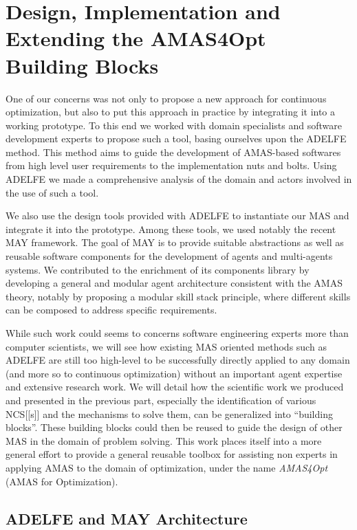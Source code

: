 \part{Design, Implementation and Extending the AMAS4Opt Building Blocks}

One of our concerns was not only to propose a new approach for continuous optimization, but also to put this approach in practice by integrating it into a working prototype. To this end we worked with domain specialists and software development experts to propose such a tool, basing ourselves upon the ADELFE method. This method aims to guide the development of AMAS-based softwares from high level user requirements to the implementation nuts and bolts. Using ADELFE we made a comprehensive analysis of the domain and actors involved in the use of such a tool.

We also use the design tools provided with ADELFE to instantiate our MAS and integrate it into the prototype. Among these tools, we used notably the recent MAY framework. The goal of MAY is to provide suitable abstractions as well as reusable software components for the development of agents and multi-agents systems. We contributed to the enrichment of its components library by developing a general and modular agent architecture consistent with the AMAS theory, notably by proposing a modular skill stack principle, where different skills can be composed to address specific requirements.

While such work could seems to concerns software engineering experts more than computer scientists, we will see how existing MAS oriented methods such as ADELFE are still too high-level to be successfully directly applied to any domain (and more so to continuous optimization) without an important agent expertise and extensive research work. We will detail how the scientific work we produced and presented in the previous part, especially the identification of various NCS[[s]] and the mechanisms to solve them, can be generalized into \enquote{building blocks}. These building blocks could then be reused to guide the design of other MAS in the domain of problem solving. This work places itself into a more general effort to provide a general reusable toolbox for assisting non experts in applying AMAS to the domain of optimization, under the name \emph{AMAS4Opt} (AMAS for Optimization).

\chapter{ADELFE and MAY Architecture}\label{ADELFE_chapter}

